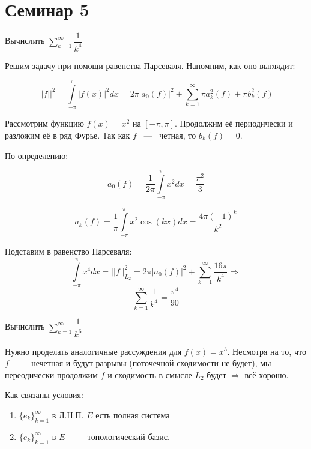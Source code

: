 \newpage

\section{Семинар 5}

\begin{problem}
    Вычислить $\sum\limits_{k = 1}^{\infty} \dfrac{1}{k^4}$
\end{problem}

\begin{answer}
    Решим задачу при помощи равенства Парсеваля. Напомним, как оно выглядит:

    $$
    ||f||^2 = \int\limits_{-\pi}^{\pi} |f(x)|^2 dx = 2\pi |a_0(f)|^2 + \sum\limits_{k = 1}^{\infty} \pi a_k^2(f) + \pi b_k^2(f)
    $$

    \noindent Рассмотрим функцию $f(x) = x^2$ на $[-\pi, \pi]$. Продолжим её периодически и разложим её в ряд Фурье. Так как $f$ ~---~ четная, то $b_k(f) = 0$.

    \noindent По определению:

    $$
    a_0(f) = \dfrac{1}{2\pi} \int\limits_{-\pi}^{\pi} x^2 dx = \dfrac{\pi^2}{3}
    $$

    $$
    a_k(f) = \dfrac{1}{\pi} \int\limits_{-\pi}^{\pi} x^2 \cos (kx) dx = \dfrac{4\pi (-1)^k}{k^2}
    $$

    \noindent Подставим в равенство Парсеваля:
    $$
    \int\limits_{-\pi}^{\pi} x^4 dx = ||f||^2_{L_2} = 2\pi |a_0(f)|^2 + \sum\limits_{k = 1}^{\infty} \dfrac{16\pi}{k^4} \Rightarrow
    $$
    $$
    \sum\limits_{k = 1}^{\infty} \dfrac{1}{k^4} = \dfrac{\pi^4}{90}
    $$
\end{answer}

\begin{problem}
    Вычислить $\sum\limits_{k = 1}^{\infty} \dfrac{1}{k^6}$
\end{problem}

\begin{answer}
    Нужно проделать аналогичные рассуждения для $f(x) = x^3$. Несмотря на то, что $f$ ~---~ нечетная и будут разрывы (поточечной сходимости не будет), мы переодически продолжим $f$ и сходимость в смысле $L_2$ будет $\Rightarrow$ всё хорошо.
\end{answer}

\begin{problem}
    Как связаны условия:

    \begin{enumerate}
        \item $\{e_k\}_{k = 1}^{\infty}$ в Л.Н.П. $E$ есть полная система
        \item $\{e_k\}_{k = 1}^{\infty}$ в $E$ ~---~ топологический базис.
    \end{enumerate}
\end{problem}

